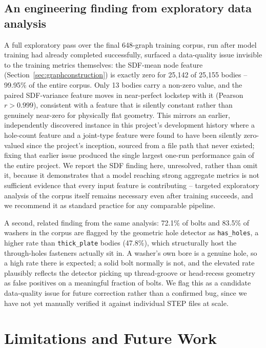 \documentclass[sn-mathphys,Numbered]{sn-jnl}
\begin{document}
\subsection{An engineering finding from exploratory data analysis}\label{sec:eda-finding}

A full exploratory pass over the final 648-graph training corpus, run after model training had already completed successfully, surfaced a data-quality issue invisible to the training metrics themselves: the SDF-mean node feature (Section~\ref{sec:graphconstruction}) is exactly zero for 25{,}142 of 25{,}155 bodies -- 99.95\% of the entire corpus. Only 13 bodies carry a non-zero value, and the paired SDF-variance feature moves in near-perfect lockstep with it (Pearson $r > 0.999$), consistent with a feature that is silently constant rather than genuinely near-zero for physically flat geometry. This mirrors an earlier, independently discovered instance in this project's development history where a hole-count feature and a joint-type feature were found to have been silently zero-valued since the project's inception, sourced from a file path that never existed; fixing that earlier issue produced the single largest one-run performance gain of the entire project. We report the SDF finding here, unresolved, rather than omit it, because it demonstrates that a model reaching strong aggregate metrics is not sufficient evidence that every input feature is contributing -- targeted exploratory analysis of the corpus itself remains necessary even after training succeeds, and we recommend it as standard practice for any comparable pipeline.

A second, related finding from the same analysis: 72.1\% of bolts and 83.5\% of washers in the corpus are flagged by the geometric hole detector as \texttt{has\_holes}, a higher rate than \texttt{thick\_plate} bodies (47.8\%), which structurally host the through-holes fasteners actually sit in. A washer's own bore is a genuine hole, so a high rate there is expected; a solid bolt normally is not, and the elevated rate plausibly reflects the detector picking up thread-groove or head-recess geometry as false positives on a meaningful fraction of bolts. We flag this as a candidate data-quality issue for future correction rather than a confirmed bug, since we have not yet manually verified it against individual STEP files at scale.

\section{Limitations and Future Work}\label{sec:limitations}
\end{document}

